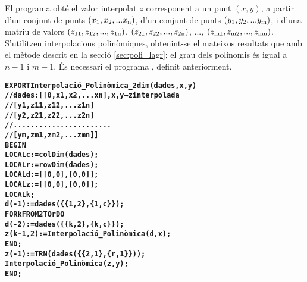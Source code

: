 El programa  obté el valor interpolat $z$ corresponent a un punt $(x, y)$, a partir d'un conjunt de punts $(x_\mathrm{1}, x_\mathrm{2}, ... x_\mathrm{n})$, d'un conjunt de punts $(y_\mathrm{1}, y_\mathrm{2}, ... y_\mathrm{m})$, i d'una matriu de valors $(z_\mathrm{11}, z_\mathrm{12}, ..., z_\mathrm{1n})$,
$(z_\mathrm{21}, z_\mathrm{22}, ..., z_\mathrm{2n})$, ..., $(z_\mathrm{m1}, z_\mathrm{m2}, ..., z_\mathrm{mn})$. S'utilitzen  interpolacions polinòmiques, obtenint-se el mateixos resultats que amb el mètode descrit en la secció \vref{sec:poli_lagr}; el grau dels polinomis és igual a $n-1$ i $m-1$.
És necessari el programa , definit anteriorment.
\pagebreak
\begin{alltt}
\bfseries
{}
    EXPORT Interpolació_Polinòmica_2dim(dades,x,y)
    // dades:[[0,   x1,  x2, ...  xn], x, y → z interpolada
    //        [y1, z11, z12, ... z1n]
    //        [y2, z21, z22, ... z2n]
    //        .......................
    //        [ym, zm1, zm2, ... zmn]]
    BEGIN
      LOCAL c:=colDim(dades);
      LOCAL r:=rowDim(dades);
      LOCAL d:=[[0,0],[0,0]];
      LOCAL z:=[[0,0],[0,0]];
      LOCAL k;
      d(-1):=dades(\{\{1,2\},\{1,c\}\});
      FOR k FROM 2 TO r DO
        d(-2):=dades(\{\{k,2\},\{k,c\}\});
        z(k-1,2):=Interpolació_Polinòmica(d,x);
      END;
      z(-1):=TRN(dades(\{\{2,1\},\{r,1\}\}));
      Interpolació_Polinòmica(z,y);
    END;
\end{alltt}

